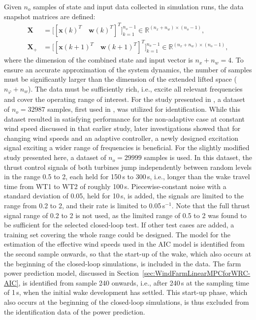 Given $n_o$ samples of state and input data collected in simulation runs, the data snapshot matrices are defined:
\begin{align} \label{eq:DataCollAIC}
    \bm{X} &= \bigl[ [\bm{x}(k)^T \quad \bm{w}(k)^T]^T \bigr]_{k=1}^{n_o-1} \in \mathbb{R}^{(n_x+n_w)\times (n_o-1)}, \\
    \bm{X}_{+} &= \bigl[ [\bm{x}(k+1)^T\quad \bm{w}(k+1)^T]^T \bigr]_{k=1}^{n_o-1} \in \mathbb{R}^{(n_x+n_w)\times (n_o-1)},
\end{align}
where the dimension of the combined state and input vector is $n_x + n_w = 4$. To ensure an accurate approximation of the system dynamics, the number of samples must be significantly larger than the dimension of the extended lifted space ($n_\varphi + n_w$). The data must be sufficiently rich, i.e., excite all relevant frequencies and cover the operating range of interest. For the study presented in \cite{dittmer2022data}, a dataset of $n_o = 32987$ samples, first used in \cite{sharan2022Koopman}, was utilized for identification. While this dataset resulted in satisfying performance for the non-adaptive case at constant wind speed discussed in that earlier study, later investigations showed that for changing wind speeds and an adaptive controller, a newly designed excitation signal exciting a wider range of frequencies is beneficial. For the slightly modified study presented here, a dataset of $n_o = 29999$ samples is used. In this dataset, the thrust control signals of both turbines jump independently between random levels in the range 0.5 to 2, each held for 150\,s to 300\,s, i.e., longer than the wake travel time from WT1 to WT2 of roughly 100\,s. Piecewise-constant noise with a standard deviation of 0.05, held for 10\,s, is added, the signals are limited to the range from 0.2 to 2, and their rate is limited to 0.05\,s$^{-1}$. Note that the full thrust signal range of 0.2 to 2 is not used, as the limited range of 0.5 to 2 was found to be sufficient for the selected closed-loop test. If other test cases are added, a training set covering the whole range could be designed. The model for the estimation of the effective wind speeds used in the AIC model is identified from the second sample onwards, so that the start-up of the wake, which also occurs at the beginning of the closed-loop simulations, is included in the data. The farm power prediction model, discussed in Section~\ref{sec:WindFarmLinearMPCforWRC-AIC}, is identified from sample 240 onwards, i.e., after 240\,s at the sampling time of 1\,s, when the initial wake development has settled. This start-up phase, which also occurs at the beginning of the closed-loop simulations, is thus excluded from the identification data of the power prediction.

